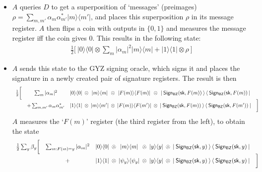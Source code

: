 \documentclass{article}
\begin{document}
\begin{itemize}
    \item $A$ queries $D$ to get a superposition of `messages' (preimages) $\rho = \sum_{m, m'} \alpha_m \alpha_{m'}^* | m \rangle \langle m' |$, and places this superposition $\rho$ in its message register. $A$ then flips a coin with outputs in $\{0,1\}$ and measures the message register iff the coin gives 0. This results in the following state:
    \begin{align}
        \frac{1}{2} \bigg[ \: |0\rangle \langle 0| \otimes \sum_m |\alpha_m|^2 |m \rangle \langle m| + |1\rangle \langle 1| \otimes \rho \: \bigg]
    \end{align}
    \item $A$ sends this state to the GYZ signing oracle, which signs it and places the signature in a newly created pair of signature registers. The result is then
    \begin{align}
        \begin{split}
        \begin{array}{c c c @{\:\:\otimes\:\:} c @{\:\:\otimes\:\:} c @{\:\:\otimes\:\:} c c}
            \frac{1}{2} \bigg[ & \sum_m |\alpha_m|^2 & |0\rangle \langle 0| & |m \rangle \langle m| &  |F(m) \rangle \langle F(m)| & \Ket{ \: \mathsf{Sign_{BZ}(sk}, F(m)) \: } \Bra{ \: \mathsf{Sign_{BZ}(sk}, F(m)) \: } & \\
            & + \sum_{m, m'} \alpha_m \alpha_{m'}^* & |1\rangle \langle 1| & |m \rangle \langle m'| & | F(m) \rangle \langle F(m')| & \Ket{ \: \mathsf{Sign_{BZ}(sk}, F(m)) \: } \Bra{ \: \mathsf{Sign_{BZ}(sk}, F(m')) \: } & \bigg]
        \end{array}
        \end{split}
    \end{align}
    $A$ measures the `$F(m)$' register (the third register from the left), to obtain the state
    \begin{align}
        \begin{split}
        \begin{array}{c c c @{\:\:\otimes\:\:} c @{\:\:\otimes\:\:} c @{\:\:\otimes\:\:} c c}
            \frac{1}{2} \sum_y \beta_y \bigg[ & \sum_{m : F(m) = y} |\alpha_m|^2 & |0\rangle \langle 0| & |m \rangle \langle m| &  |y \rangle \langle y| & \Ket{ \: \mathsf{Sign_{BZ}(sk}, y) \: } \Bra{ \: \mathsf{Sign_{BZ}(sk}, y) \: } & \\
            & + & |1\rangle \langle 1| & |\psi_y \rangle \langle \psi_y| & | y \rangle \langle y| & \Ket{ \: \mathsf{Sign_{BZ}(sk}, y) \: } \Bra{ \: \mathsf{Sign_{BZ}(sk}, y) \: } & \bigg]

\end{array}
\end{split}
\end{align}
\end{itemize}
\end{document}
